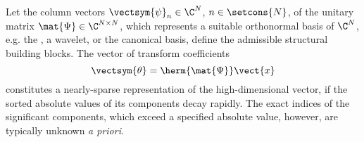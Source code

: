 Let
the column vectors
$\vectsym{\psi}_{n} \in \C^{ N }$,
$n \in \setcons{ N }$, of
the unitary matrix
$\mat{\Psi} \in \C^{ N \times N }$, which represents
a suitable orthonormal basis of
$\C^{ N }$, e.g.
the ,
a wavelet, or
the canonical basis, define
the admissible structural building blocks.
The vector of
transform coefficients
\begin{equation}
  \vectsym{\theta}
  =
  \herm{ \mat{\Psi} }
  \vect{x}
 \label{eqn:def_transform_coefficients}
\end{equation}
constitutes
a nearly-sparse representation of
the high-dimensional vector, if
the sorted absolute values of
its components decay rapidly.
The exact indices of
the significant components, which exceed
a specified absolute value, however, are
typically unknown \emph{a priori}.

